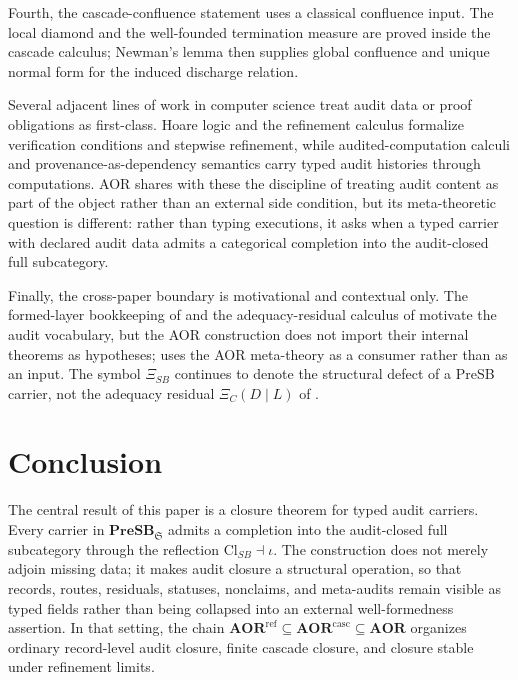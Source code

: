 \documentclass[11pt]{article}
\newcommand{\PreSB}{\mathbf{PreSB}}
\newcommand{\AOR}{\mathbf{AOR}}
\newcommand{\CascadeStableAOR}{\mathbf{AOR}^{\mathrm{casc}}}
\newcommand{\RefStableAOR}{\mathbf{AOR}^{\mathrm{ref}}}
\newcommand{\ClSB}{\mathrm{Cl}_{SB}}
\newcommand{\XiSB}{\Xi_{SB}}
\theoremstyle{definition}
\begin{document}
Fourth, the cascade-confluence statement
 uses a classical confluence input.
The local diamond and the well-founded termination measure are proved
inside the cascade calculus; Newman's lemma then supplies global
confluence and unique normal form for the induced discharge relation.

Several adjacent lines of work in computer science treat audit data
or proof obligations as first-class.  Hoare logic
\citep{Hoare1969AxiomaticBasis} and the refinement
calculus \citep{BackVonWright1998Refinement} formalize verification
conditions and stepwise refinement, while audited-computation calculi
\citep{BaveraBonelli2018AuditedComputation,RicciottiCheney2018ExplicitAuditing}
and provenance-as-dependency semantics
\citep{CheneyAhmedAcar2011Provenance} carry typed audit histories
through computations.  AOR shares with these the discipline of
treating audit content as part of the object rather than an external
side condition, but its meta-theoretic question is different: rather
than typing executions, it asks when a typed carrier with declared
audit data admits a categorical completion into the audit-closed
full subcategory.

Finally, the cross-paper boundary is motivational and contextual
only.  The formed-layer bookkeeping of
\citet{Tsiokos2026NeedleKiller} and the adequacy-residual calculus of
\citet{Tsiokos2026XiCompanion} motivate the audit vocabulary, but the
AOR construction does not import their internal theorems as
hypotheses; \citet{Tsiokos2026NavierStokes} uses the AOR meta-theory
as a consumer rather than as an input.  The symbol $\XiSB$ continues
to denote the structural defect of a PreSB carrier, not the adequacy
residual $\Xi_C(D\mid L)$ of \citet{Tsiokos2026XiCompanion}.
 

\section{Conclusion}\label{sec:aor-conclusion}

The central result of this paper is a closure theorem for typed
audit carriers.  Every carrier in $\PreSB_{\mathfrak S}$ admits a
completion into the audit-closed full subcategory through the
reflection $\ClSB\dashv\iota$.  The construction does not merely
adjoin missing data; it makes audit closure a structural operation,
so that records, routes, residuals, statuses, nonclaims, and
meta-audits remain visible as typed fields rather than being
collapsed into an external well-formedness assertion.  In that
setting, the chain
$\RefStableAOR\subseteq\CascadeStableAOR\subseteq\AOR$ organizes
ordinary record-level audit closure, finite cascade closure, and
closure stable under refinement limits.
\end{document}
